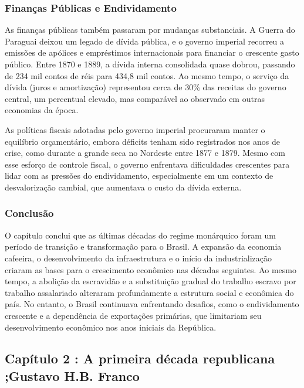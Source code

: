 \documentclass[a4paper,12pt]{article}[abntex2]
\begin{document}
\subsubsection*{Finanças Públicas e Endividamento}

As finanças públicas também passaram por mudanças substanciais. A Guerra do Paraguai deixou um legado de dívida pública, e o governo imperial recorreu a emissões de apólices e empréstimos internacionais para financiar o crescente gasto público. Entre 1870 e 1889, a dívida interna consolidada quase dobrou, passando de 234 mil contos de réis para 434,8 mil contos. Ao mesmo tempo, o serviço da dívida (juros e amortização) representou cerca de 30\% das receitas do governo central, um percentual elevado, mas comparável ao observado em outras economias da época.

As políticas fiscais adotadas pelo governo imperial procuraram manter o equilíbrio orçamentário, embora déficits tenham sido registrados nos anos de crise, como durante a grande seca no Nordeste entre 1877 e 1879. Mesmo com esse esforço de controle fiscal, o governo enfrentava dificuldades crescentes para lidar com as pressões do endividamento, especialmente em um contexto de desvalorização cambial, que aumentava o custo da dívida externa.

\subsubsection*{Conclusão}

O capítulo conclui que as últimas décadas do regime monárquico foram um período de transição e transformação para o Brasil. A expansão da economia cafeeira, o desenvolvimento da infraestrutura e o início da industrialização criaram as bases para o crescimento econômico nas décadas seguintes. Ao mesmo tempo, a abolição da escravidão e a substituição gradual do trabalho escravo por trabalho assalariado alteraram profundamente a estrutura social e econômica do país. No entanto, o Brasil continuava enfrentando desafios, como o endividamento crescente e a dependência de exportações primárias, que limitariam seu desenvolvimento econômico nos anos iniciais da República.

\newpage 

\subsection{\textbf{Capítulo 2 : A primeira década republicana ;Gustavo H.B. Franco}}
\end{document}
